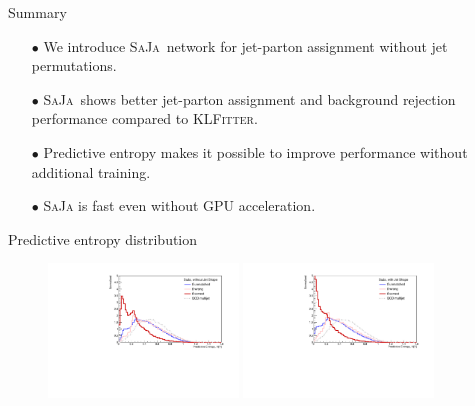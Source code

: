 \documentclass[10pt]{beamer}
\begin{document}
%

\begin{frame}[fragile]{Summary}
    \begin{itemize}
        \item[$\bullet$] We introduce \textsc{SaJa}\, network for jet-parton assignment without jet permutations.
        \item[$\bullet$] \textsc{SaJa}\, shows better jet-parton assignment and background rejection performance compared to \textsc{KLFitter}.
        \item[$\bullet$] Predictive entropy makes it possible to improve performance without additional training.
        \item[$\bullet$] \textsc{SaJa} is fast even without GPU acceleration.
    \end{itemize}
\end{frame}


\appendix






\begin{frame}[fragile]{Predictive entropy distribution}
    \begin{figure}
        \centering
        \includegraphics[width=0.45\textwidth]{figures/entropy/entropy_without_jet_shape.pdf}
        \includegraphics[width=0.45\textwidth]{figures/entropy/entropy_with_jet_shape.pdf}
    \end{figure}
\end{frame}
\end{document}
